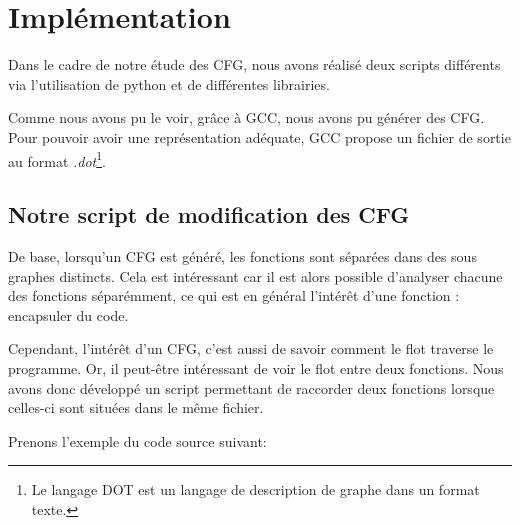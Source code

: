 \section{Implémentation}
Dans le cadre de notre étude des CFG, nous avons réalisé deux scripts différents via l'utilisation de python et de différentes librairies.

Comme nous avons pu le voir, grâce à GCC, nous avons pu générer des CFG. Pour pouvoir avoir une représentation adéquate, GCC propose un fichier de sortie au format \textit{.dot}\footnote{Le langage DOT est un langage de description de graphe dans un format texte.}.

\subsection{Notre script de modification des CFG}
De base, lorsqu'un CFG est généré, les fonctions sont séparées dans des sous graphes distincts. Cela est intéressant car il est alors possible d'analyser chacune des fonctions séparémment, ce qui est en général l'intérêt d'une fonction : encapsuler du code.

Cependant, l'intérêt d'un CFG, c'est aussi de savoir comment le flot traverse le programme. Or, il peut-être intéressant de voir le flot entre deux fonctions. Nous avons donc développé un script permettant de raccorder deux fonctions lorsque celles-ci sont situées dans le même fichier.

Prenons l'exemple du code source suivant:


